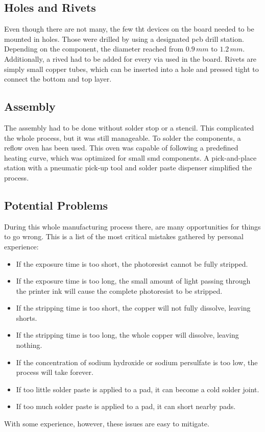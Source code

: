 \subsection{Holes and Rivets}

Even though there are not many, the few \gls{tht} devices on the board needed to be mounted in holes. Those were drilled by using a designated \gls{pcb} drill station. Depending on the component, the diameter reached from \(0.9\,mm\) to \(1.2\,mm\). Additionally, a rived had to be added for every via used in the board. Rivets are simply small copper tubes, which can be inserted into a hole and pressed tight to connect the bottom and top layer.

\subsection{Assembly}

The assembly had to be done without solder stop or a stencil. This complicated the whole process, but it was still manageable. To solder the components, a reflow oven has been used. This oven was capable of following a predefined heating curve, which was optimized for small \gls{smd} components. A pick-and-place station with a pneumatic pick-up tool and solder paste dispenser simplified the process.

\subsection{Potential Problems}

During this whole manufacturing process there, are many opportunities for things to go wrong. This is a list of the most critical mistakes gathered by personal experience:

\begin{itemize}
    \item If the exposure time is too short, the photoresist cannot be fully stripped.
    \item If the exposure time is too long, the small amount of light passing through the printer ink will cause the complete photoresist to be stripped.
    \item If the stripping time is too short, the copper will not fully dissolve, leaving shorts.
    \item If the stripping time is too long, the whole copper will dissolve, leaving nothing.
    \item If the concentration of sodium hydroxide or sodium persulfate is too low, the process will take forever.
    \item If too little solder paste is applied to a pad, it can become a cold solder joint.
    \item If too much solder paste is applied to a pad, it can short nearby pads.
\end{itemize}

With some experience, however, these issues are easy to mitigate.

\newpage
\pagestyle{empty}
\mbox{}
\newpage
\mbox{}
\newpage
\pagestyle{scrheadings}